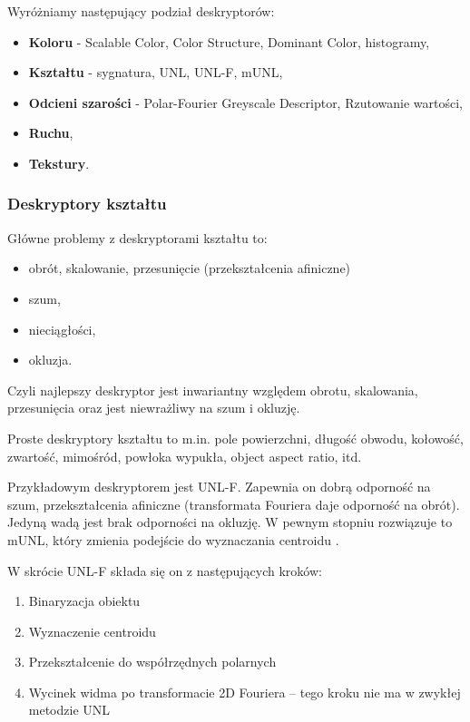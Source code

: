 \documentclass[wi]{zut}
\begin{document}
Wyróżniamy następujący podział deskryptorów:

\begin{itemize}
    \item \textbf{Koloru} - Scalable Color, Color Structure, Dominant Color, histogramy,
    \item \textbf{Kształtu} - sygnatura, UNL, UNL-F, mUNL,
    \item \textbf{Odcieni szarości} - Polar-Fourier Greyscale Descriptor, Rzutowanie wartości,
    \item \textbf{Ruchu},
    \item \textbf{Tekstury}.
\end{itemize}

\subsubsection{Deskryptory kształtu}

Główne problemy z deskryptorami kształtu to:

\begin{itemize}
    \item obrót, skalowanie, przesunięcie (przekształcenia afiniczne)
    \item szum,
    \item nieciągłości,
    \item okluzja.
\end{itemize}

Czyli najlepszy deskryptor jest inwariantny względem obrotu, skalowania, przesunięcia oraz jest niewrażliwy na szum i okluzję.

Proste deskryptory kształtu to m.in. pole powierzchni, długość obwodu, kołowość, zwartość, mimośród, powłoka wypukła, object aspect ratio, itd. \cite{Frejlichowski2020_2}

Przykładowym deskryptorem jest UNL-F. Zapewnia on dobrą odporność na szum, przekształcenia afiniczne (transformata Fouriera daje odporność na obrót). Jedyną wadą jest brak odporności na okluzję. W pewnym stopniu rozwiązuje to mUNL, który zmienia podejście do wyznaczania centroidu  \cite{Frejlichowski2020_2}.

W skrócie UNL-F składa się on z następujących kroków:

\begin{enumerate}
    \item Binaryzacja obiektu
    \item Wyznaczenie centroidu
    \item Przekształcenie do współrzędnych polarnych
    \item Wycinek widma po transformacie 2D Fouriera -- tego kroku nie ma w zwykłej metodzie UNL
\end{enumerate}
\end{document}
